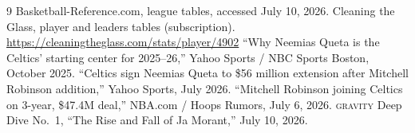 \documentclass[11pt]{article}
\newcommand{\gravity}{\textsc{gravity}}
\begin{document}
\begin{thebibliography}{9}
 Basketball-Reference.com, league tables, accessed July 10, 2026.
 Cleaning the Glass, player and leaders tables (subscription).
\url{https://cleaningtheglass.com/stats/player/4902}
 ``Why Neemias Queta is the Celtics' starting center for 2025--26,''
Yahoo Sports / NBC Sports Boston, October 2025.
 ``Celtics sign Neemias Queta to \$56 million extension after Mitchell
Robinson addition,'' Yahoo Sports, July 2026.
 ``Mitchell Robinson joining Celtics on 3-year, \$47.4M deal,''
NBA.com / Hoops Rumors, July 6, 2026.
 \gravity{} Deep Dive No.\ 1, ``The Rise and Fall of Ja Morant,''
July 10, 2026.
\end{thebibliography}
\end{document}

